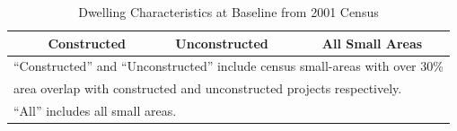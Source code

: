 \documentclass[12pt]{article}
\begin{document}
\begin{table}[h!]
	\centering
	\caption{Dwelling Characteristics at Baseline from 2001 Census}\label{table:projectdescriptivescensus}
\vspace{-2mm}
\begin{tabular}{l*{1}{ccc}}
\toprule
& Constructed & Unconstructed & All Small Areas \\
\midrule
 
\bottomrule
\multicolumn{4}{l}{\scriptsize ``Constructed'' and ``Unconstructed'' include census small-areas with over 30\% } \\ [-.5em]
\multicolumn{4}{l}{\scriptsize  area overlap with constructed and unconstructed projects respectively. } \\ [-.5em]
\multicolumn{4}{l}{\scriptsize ``All''  includes all small areas.}
\end{tabular}
\end{table}
\end{document}

